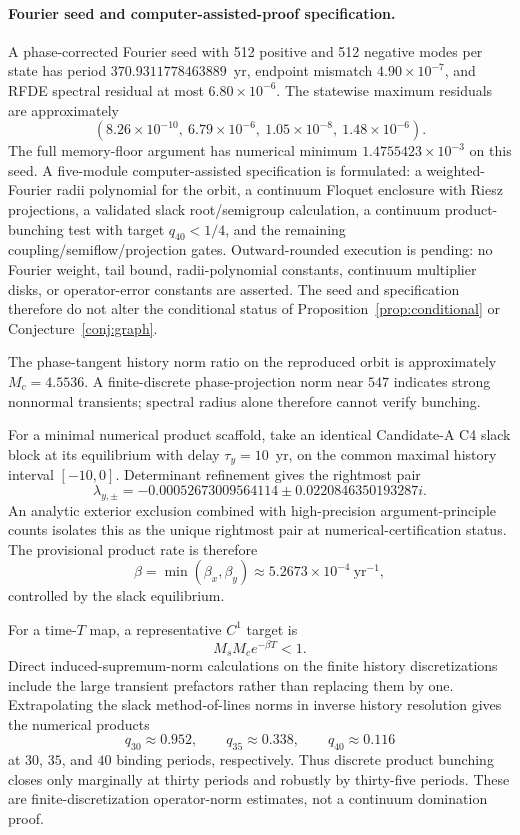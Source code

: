 \documentclass[11pt]{article}
\theoremstyle{definition}
\theoremstyle{remark}
\begin{document}
\paragraph{Fourier seed and computer-assisted-proof specification.}
A phase-corrected Fourier seed with 512 positive and 512 negative modes per state has period $370.9311778463889$~yr, endpoint mismatch $4.90\times10^{-7}$, and RFDE spectral residual at most $6.80\times10^{-6}$. The statewise maximum residuals are approximately
\[
(8.26\times10^{-10},\ 6.79\times10^{-6},\ 1.05\times10^{-8},\ 1.48\times10^{-6}).
\]
The full memory-floor argument has numerical minimum $1.4755423\times10^{-3}$ on this seed. A five-module computer-assisted specification is formulated: a weighted-Fourier radii polynomial for the orbit, a continuum Floquet enclosure with Riesz projections, a validated slack root/semigroup calculation, a continuum product-bunching test with target $q_{40}<1/4$, and the remaining coupling/semiflow/projection gates. Outward-rounded execution is pending: no Fourier weight, tail bound, radii-polynomial constants, continuum multiplier disks, or operator-error constants are asserted. The seed and specification therefore do not alter the conditional status of Proposition~\ref{prop:conditional} or Conjecture~\ref{conj:graph}.

The phase-tangent history norm ratio on the reproduced orbit is approximately $M_c=4.5536$. A finite-discrete phase-projection norm near $547$ indicates strong nonnormal transients; spectral radius alone therefore cannot verify bunching.

For a minimal numerical product scaffold, take an identical Candidate-A C4 slack block at its equilibrium with delay $\tau_y=10$~yr, on the common maximal history interval $[-10,0]$. Determinant refinement gives the rightmost pair
\[
\lambda_{y,\pm}
=-0.00052673009564114
\pm0.0220846350193287i.
\]
An analytic exterior exclusion combined with high-precision argument-principle counts isolates this as the unique rightmost pair at numerical-certification status. The provisional product rate is therefore
\[
\beta=\min(\beta_x,\beta_y)
\approx5.2673\times10^{-4}~\mathrm{yr}^{-1},
\]
controlled by the slack equilibrium.

For a time-$T$ map, a representative $C^1$ target is
\[
M_sM_c e^{-\beta T}<1.
\]
Direct induced-supremum-norm calculations on the finite history discretizations include the large transient prefactors rather than replacing them by one. Extrapolating the slack method-of-lines norms in inverse history resolution gives the numerical products
\[
q_{30}\approx0.952,
\qquad q_{35}\approx0.338,
\qquad q_{40}\approx0.116
\]
at $30$, $35$, and $40$ binding periods, respectively. Thus discrete product bunching closes only marginally at thirty periods and robustly by thirty-five periods. These are finite-discretization operator-norm estimates, not a continuum domination proof.
\end{document}
